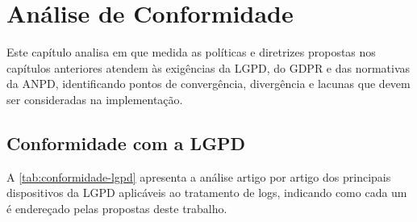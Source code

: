 
\chapter{Análise de Conformidade}
\label{cap:conformidade}

Este capítulo analisa em que medida as políticas e diretrizes propostas nos capítulos anteriores atendem às exigências da LGPD, do GDPR e das normativas da ANPD, identificando pontos de convergência, divergência e lacunas que devem ser consideradas na implementação.

\section{Conformidade com a LGPD}
\label{sec:conformidade-lgpd}

A \autoref{tab:conformidade-lgpd} apresenta a análise artigo por artigo dos principais dispositivos da LGPD aplicáveis ao tratamento de logs, indicando como cada um é endereçado pelas propostas deste trabalho.

